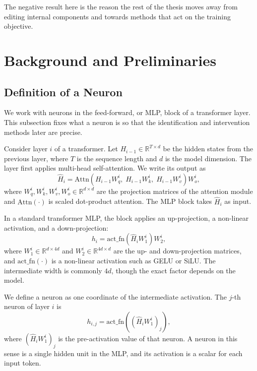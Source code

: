The negative result here is the reason the rest of the thesis moves away from
editing internal components and towards methods that act on the training
objective.

\section{Background and Preliminaries}
\label{sec:neurons-background}

\subsection{Definition of a Neuron}
\label{subsec:neurons-definition}

We work with neurons in the feed-forward, or MLP, block of a transformer layer.
This subsection fixes what a neuron is so that the identification and intervention
methods later are precise.

Consider layer $i$ of a transformer. Let $H_{i-1} \in \mathbb{R}^{T \times d}$ be
the hidden states from the previous layer, where $T$ is the sequence length and
$d$ is the model dimension. The layer first applies multi-head self-attention. We
write its output as
\begin{equation}
	\hat{H}_i = \mathrm{Attn}\!\left(H_{i-1} W^i_q,\; H_{i-1} W^i_k,\; H_{i-1} W^i_v\right) W^i_o,
	\label{eq:neurons-attn}
\end{equation}
where $W^i_q, W^i_k, W^i_v, W^i_o \in \mathbb{R}^{d \times d}$ are the projection
matrices of the attention module and $\mathrm{Attn}(\cdot)$ is scaled dot-product
attention. The MLP block takes $\hat{H}_i$ as input.

In a standard transformer MLP, the block applies an up-projection, a non-linear
activation, and a down-projection:
\begin{equation}
	h_i = \mathrm{act\_fn}\!\left(\hat{H}_i W^i_1\right) W^i_2,
	\label{eq:neurons-mlp}
\end{equation}
where $W^i_1 \in \mathbb{R}^{d \times 4d}$ and $W^i_2 \in \mathbb{R}^{4d \times d}$
are the up- and down-projection matrices, and $\mathrm{act\_fn}(\cdot)$ is a
non-linear activation such as GELU or SiLU. The intermediate width is commonly
$4d$, though the exact factor depends on the model.

We define a neuron as one coordinate of the intermediate activation. The $j$-th
neuron of layer $i$ is
\begin{equation}
	h_{i,j} = \mathrm{act\_fn}\!\left(\left(\hat{H}_i W^i_1\right)_j\right),
	\label{eq:neurons-neuron}
\end{equation}
where $\left(\hat{H}_i W^i_1\right)_j$ is the pre-activation value of that neuron.
A neuron in this sense is a single hidden unit in the MLP, and its activation is a
scalar for each input token.

